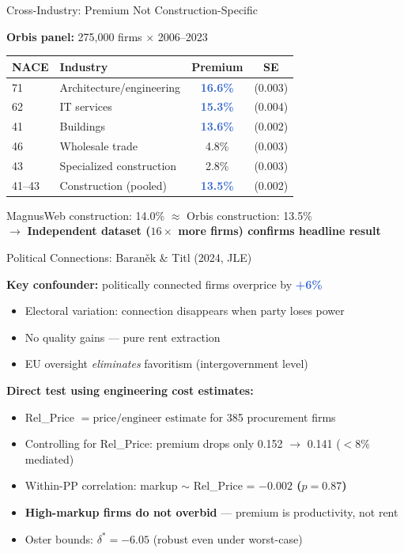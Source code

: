 \documentclass[aspectratio=169,11pt]{beamer}
\newcommand{\accenttext}[1]{\textcolor{accent}{\textbf{#1}}}
\newcommand{\highlighttext}[1]{\textcolor{highlight}{\textbf{#1}}}
\begin{document}
\begin{frame}{Cross-Industry: Premium Not Construction-Specific}

\textbf{Orbis panel:} 275,000 firms $\times$ 2006--2023

\medskip
\begin{center}
\begin{tabular}{llcc}
\toprule
NACE & Industry & Premium & SE \\
\midrule
71 & Architecture/engineering & \highlighttext{16.6\%} & (0.003) \\
62 & IT services & \highlighttext{15.3\%} & (0.004) \\
41 & Buildings & \highlighttext{13.6\%} & (0.002) \\
46 & Wholesale trade & 4.8\% & (0.003) \\
43 & Specialized construction & 2.8\% & (0.003) \\
\midrule
41--43 & Construction (pooled) & \highlighttext{13.5\%} & (0.002) \\
\bottomrule
\end{tabular}
\end{center}

\pause
\medskip
MagnusWeb construction: 14.0\% $\approx$ Orbis construction: 13.5\% \\
$\rightarrow$ \accenttext{Independent dataset ($16\times$ more firms) confirms headline result}

\end{frame}

\begin{frame}{Political Connections: Baran\v{e}k \& Titl (2024, JLE)}

\textbf{Key confounder:} politically connected firms overprice by \highlighttext{+6\%}
\begin{itemize}
    \item Electoral variation: connection disappears when party loses power
    \item No quality gains --- pure rent extraction
    \item EU oversight \emph{eliminates} favoritism (intergovernment level)
\end{itemize}

\pause
\medskip
\textbf{Direct test using engineering cost estimates:}
\begin{itemize}
    \item Rel\_Price $= \text{price} / \text{engineer estimate}$ for 385 procurement firms
    \item Controlling for Rel\_Price: premium drops only 0.152 $\to$ 0.141 ($<$8\% mediated)
    \item Within-PP correlation: markup $\sim$ Rel\_Price = \accenttext{$-0.002$ ($p = 0.87$)}
    \item \textbf{High-markup firms do not overbid} --- premium is productivity, not rent
    \item Oster bounds: $\delta^* = -6.05$ (robust even under worst-case)
\end{itemize}

\end{frame}
\end{document}
